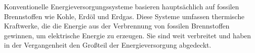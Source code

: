 Konventionelle Energieversorgungssysteme basieren hauptsächlich auf fossilen
Brennstoffen wie Kohle, Erdöl und Erdgas. Diese Systeme umfassen thermische
Kraftwerke, die die Energie aus der Verbrennung von fossilen Brennstoffen
gewinnen, um elektrische Energie zu erzeugen. Sie sind weit verbreitet und
haben in der Vergangenheit den Großteil der Energieversorgung abgedeckt.